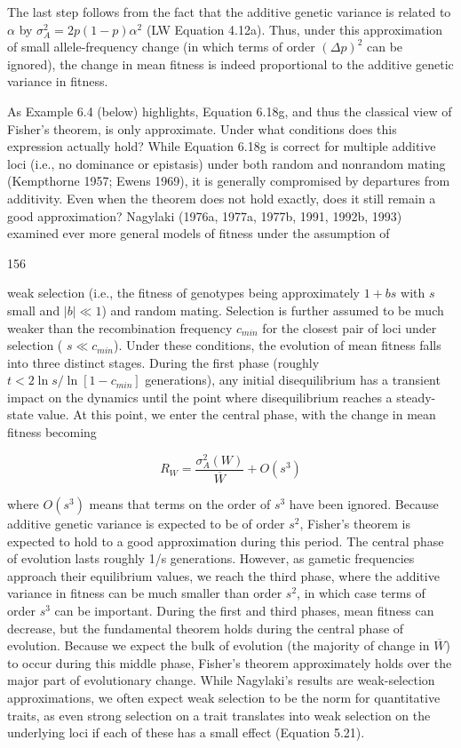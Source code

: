 \documentclass{article}
\begin{document}
The last step follows from the fact that the additive genetic variance is related to  $ \alpha $ by  $ \sigma_A^2 = 2p(1 - p)\alpha^2 $ (LW Equation 4.12a). Thus, under this approximation of small allele-frequency change (in which terms of order  $ (\Delta p)^2 $ can be ignored), the change in mean fitness is indeed proportional to the additive genetic variance in fitness.

As Example 6.4 (below) highlights, Equation 6.18g, and thus the classical view of Fisher's theorem, is only approximate. Under what conditions does this expression actually hold? While Equation 6.18g is correct for multiple additive loci (i.e., no dominance or epistasis) under both random and nonrandom mating (Kempthorne 1957; Ewens 1969), it is generally compromised by departures from additivity. Even when the theorem does not hold exactly, does it still remain a good approximation? Nagylaki (1976a, 1977a, 1977b, 1991, 1992b, 1993) examined ever more general models of fitness under the assumption of

156

weak selection (i.e., the fitness of genotypes being approximately  $ 1 + bs $ with  $ s $ small and  $ |b| \ll 1 $) and random mating. Selection is further assumed to be much weaker than the recombination frequency  $ c_{min} $ for the closest pair of loci under selection ( $ s \ll c_{min} $). Under these conditions, the evolution of mean fitness falls into three distinct stages. During the first phase (roughly  $ t < 2 \ln s / \ln [1 - c_{min}] $ generations), any initial disequilibrium has a transient impact on the dynamics until the point where disequilibrium reaches a steady-state value. At this point, we enter the central phase, with the change in mean fitness becoming

\begin{equation}
R_{W}=\frac{\sigma_{A}^{2}(W)}{\overline{W}}+O(s^{3})
\tag{6.19}
\label{eq:6_19}
\end{equation}

where  $ O(s^{3}) $ means that terms on the order of  $ s^{3} $ have been ignored. Because additive genetic variance is expected to be of order  $ s^{2} $, Fisher's theorem is expected to hold to a good approximation during this period. The central phase of evolution lasts roughly 1/s generations. However, as gametic frequencies approach their equilibrium values, we reach the third phase, where the additive variance in fitness can be much smaller than order  $ s^{2} $, in which case terms of order  $ s^{3} $ can be important. During the first and third phases, mean fitness can decrease, but the fundamental theorem holds during the central phase of evolution. Because we expect the bulk of evolution (the majority of change in  $ \overline{W} $) to occur during this middle phase, Fisher's theorem approximately holds over the major part of evolutionary change. While Nagylaki's results are weak-selection approximations, we often expect weak selection to be the norm for quantitative traits, as even strong selection on a trait translates into weak selection on the underlying loci if each of these has a small effect (Equation 5.21).
\end{document}
